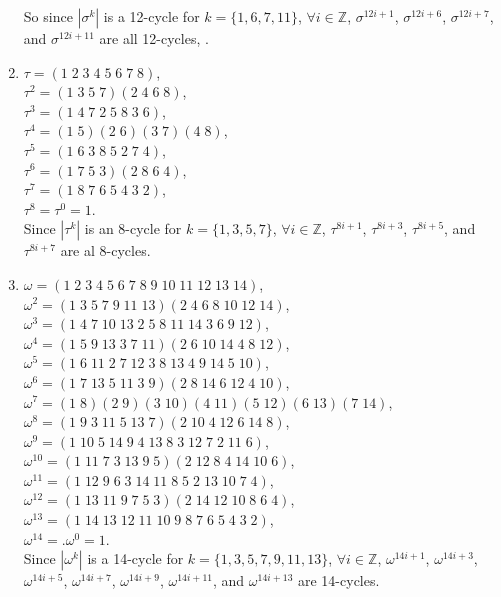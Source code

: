 \documentclass{article}
\newcommand{\Z}{\mathbb{Z}}
\begin{document}
\begin{enumerate}[label=\textbf{\alph*.}]
            So since $|\sigma^k|$ is a 12-cycle for $k = \{ 1, 6, 7, 11 \}$,
            $\forall i \in \Z$, 
            $\sigma^{12i + 1}$, $\sigma^{12i + 6}$, $\sigma^{12i + 7}$, 
            and $\sigma^{12i + 11}$ are all 12-cycles, .
        \item 
            $\tau = (1\;2\;3\;4\;5\;6\;7\;8)$, \\
            $\tau^2 = (1\;3\;5\;7)(2\;4\;6\;8)$, \\
            $\tau^3 = (1\;4\;7\;2\;5\;8\;3\;6)$, \\
            $\tau^4 = (1\;5)(2\;6)(3\;7)(4\;8)$, \\
            $\tau^5 = (1\;6\;3\;8\;5\;2\;7\;4)$, \\
            $\tau^6 = (1\;7\;5\;3)(2\;8\;6\;4)$, \\
            $\tau^7 = (1\;8\;7\;6\;5\;4\;3\;2)$, \\
            $\tau^8 = \tau^0 = 1$. \\
            Since $|\tau^k|$ is an 8-cycle for $k = \{ 1, 3, 5, 7 \}$,
            $\forall i \in \Z$, 
            $\tau^{8i + 1}$, $\tau^{8i + 3}$, $\tau^{8i + 5}$, 
            and $\tau^{8i + 7}$ are al 8-cycles.
        \item
            $\omega = (1\;2\;3\;4\;5\;6\;7\;8\;9\;10\;11\;12\;13\;14)$, \\
            $\omega^2 = (1\;3\;5\;7\;9\;11\;13)(2\;4\;6\;8\;10\;12\;14)$, \\
            $\omega^3 = (1\;4\;7\;10\;13\;2\;5\;8\;11\;14\;3\;6\;9\;12)$, \\
            $\omega^4 = (1\;5\;9\;13\;3\;7\;11)(2\;6\;10\;14\;4\;8\;12)$, \\
            $\omega^5 = (1\;6\;11\;2\;7\;12\;3\;8\;13\;4\;9\;14\;5\;10)$, \\
            $\omega^6 = (1\;7\;13\;5\;11\;3\;9)(2\;8\;14\;6\;12\;4\;10)$, \\
            $\omega^7 = (1\;8)(2\;9)(3\;10)(4\;11)(5\;12)(6\;13)(7\;14)$, \\
            $\omega^8 = (1\;9\;3\;11\;5\;13\;7)(2\;10\;4\;12\;6\;14\;8)$, \\
            $\omega^9 = (1\;10\;5\;14\;9\;4\;13\;8\;3\;12\;7\;2\;11\;6)$, \\
            $\omega^{10} = (1\;11\;7\;3\;13\;9\;5)(2\;12\;8\;4\;14\;10\;6)$, \\
            $\omega^{11} = (1\;12\;9\;6\;3\;14\;11\;8\;5\;2\;13\;10\;7\;4)$, \\
            $\omega^{12} = (1\;13\;11\;9\;7\;5\;3)(2\;14\;12\;10\;8\;6\;4)$, \\
            $\omega^{13} = (1\;14\;13\;12\;11\;10\;9\;8\;7\;6\;5\;4\;3\;2)$, \\
            $\omega^{14} = .\omega^0 = 1$. \\
            Since $|\omega^k|$ is a 14-cycle for
            $k = \{ 1, 3, 5, 7, 9, 11, 13 \}$, $\forall i \in \Z$, 
            $\omega^{14i + 1}$, $\omega^{14i + 3}$, $\omega^{14i + 5}$,
            $\omega^{14i + 7}$, $\omega^{14i + 9}$, $\omega^{14i + 11}$,
            and $\omega^{14i + 13}$ are 14-cycles.
    \end{enumerate}
\end{document}
